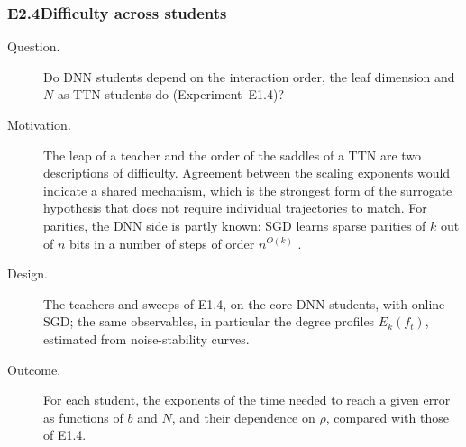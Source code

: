 \documentclass[11pt]{article}
\theoremstyle{definition}
\numberwithin{equation}{section}
\begin{document}
\subsubsection*{E2.4\quad Difficulty across students}
\begin{description}
\item[Question.] Do DNN students depend on the interaction order, the leaf dimension and $N$ as TTN students do (Experiment~E1.4)?
\item[Motivation.] The leap of a teacher and the order of the saddles of a TTN are two descriptions of difficulty. Agreement between the scaling exponents would indicate a shared mechanism, which is the strongest form of the surrogate hypothesis that does not require individual trajectories to match. For parities, the DNN side is partly known: SGD learns sparse parities of $k$ out of $n$ bits in a number of steps of order $n^{O(k)}$ \citep{barak2022hidden}.
\item[Design.] The teachers and sweeps of E1.4, on the core DNN students, with online SGD; the same observables, in particular the degree profiles $E_k(f_t)$, estimated from noise-stability curves.
\item[Outcome.] For each student, the exponents of the time needed to reach a given error as functions of $b$ and $N$, and their dependence on $\rho$, compared with those of E1.4.
\end{description}
\end{document}
